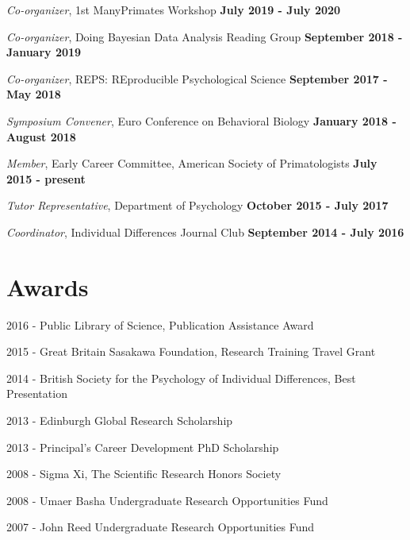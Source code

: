 \documentclass[margin,line]{res}
\newenvironment{list1}{
  \begin{list}{\ding{113}}{%
      \setlength{\itemsep}{0in}
      \setlength{\parsep}{0in} \setlength{\parskip}{0in}
      \setlength{\topsep}{0in} \setlength{\partopsep}{0in} 
      \setlength{\leftmargin}{0.17in}}}{\end{list}}
\begin{document}
\begin{resume}
\vspace{-.2cm}
{\em Co-organizer}, 1st ManyPrimates Workshop \hfill   {\bf July 2019 - July 2020}\\
\vspace{-.5cm}

\vspace{-.2cm}
{\em Co-organizer}, Doing Bayesian Data Analysis Reading Group \hfill   {\bf September 2018 - January 2019}\\
\vspace{-.5cm}

\vspace{-.2cm}
{\em Co-organizer}, REPS: REproducible Psychological Science \hfill   {\bf September 2017 - May 2018}\\
\vspace{-.5cm}

\vspace{-.2cm}
{\em Symposium Convener}, Euro Conference on Behavioral Biology \hfill  {\bf January 2018 - August 2018}\\
\vspace{-.5cm}

\vspace{-.2cm}
{\em Member}, Early Career Committee, American Society of Primatologists \hfill   {\bf July 2015 - present}\\
\vspace{-.5cm}

\vspace{-.2cm}
{\em Tutor Representative}, Department of Psychology \hfill  {\bf October 2015 - July 2017}\\
\vspace{-.5cm}

\vspace{-.2cm}
{\em Coordinator}, Individual Differences Journal Club \hfill   {\bf September 2014 - July 2016}\\
\vspace{-.5cm}


\vspace{0.7cm}

\section{\sc Awards} 
\begin{list1}

\item[2016] - Public Library of Science, Publication Assistance Award
\item[2015] - Great Britain Sasakawa Foundation, Research Training Travel Grant
\item[2014] - British Society for the Psychology of Individual Differences, Best Presentation
\item[2013] - Edinburgh Global Research Scholarship
\item[2013] - Principal's Career Development PhD Scholarship
\item[2008] - Sigma Xi, The Scientific Research Honors Society
\item[2008] - Umaer Basha Undergraduate Research Opportunities Fund
\item[2007] - John Reed Undergraduate Research Opportunities Fund


\end{list1}
\end{resume}
\end{document}
